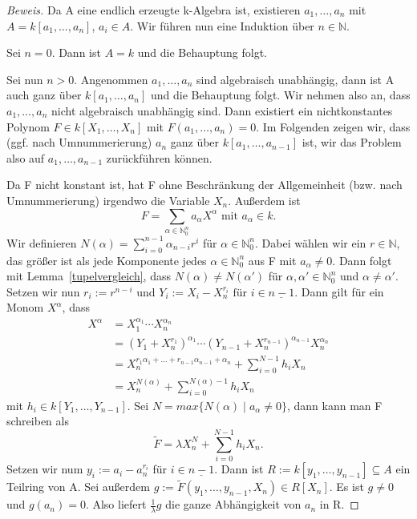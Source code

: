 \documentclass{article}
\begin{document}
	\begin{proof}[Beweis]
	Da A eine endlich erzeugte k-Algebra ist, existieren \(a_1,\ldots,a_n\) mit
	\(A = k[a_1,\ldots,a_n]\), \(a_i \in A\). Wir führen nun eine Induktion
	über \(n \in \mathbb{N}\).

	Sei \(n=0\). Dann ist \(A=k\) und die Behauptung folgt.

	Sei nun \(n > 0\). Angenommen \(a_1,\ldots,a_n\) sind algebraisch unabhängig,
	dann ist A auch ganz über \(k[a_1,\ldots,a_n]\) und die Behauptung folgt.
	Wir nehmen also an, dass \(a_1,\ldots,a_n\) nicht algebraisch unabhängig sind.
	Dann existiert ein nichtkonstantes Polynom \(F \in  k[X_1,\ldots,X_n]\)	mit
	\(F(a_1,\ldots,a_n) = 0\).
	Im Folgenden zeigen wir, dass (ggf. nach Umnummerierung) \(a_n\) ganz über
	\(k[a_1,\ldots,a_{n-1}]\) ist, wir das Problem also auf \(a_1,\ldots,a_{n-1}\)
	zurückführen können.

	Da F nicht konstant ist, hat F ohne Beschränkung der Allgemeinheit (bzw.
	nach Umnummerierung) irgendwo die Variable \(X_n\). Außerdem ist
	\begin{displaymath} F = \sum_{\alpha \in \mathbb{N}^n_0} a_{\alpha}X^{\alpha}
	\text{ mit } a_{\alpha}\in k.\end{displaymath}
	Wir definieren \(N(\alpha) = \sum^{n-1}_{i=0} \alpha_{n-i}r^i\) für
	\(\alpha \in \mathbb{N}^n_0\). Dabei wählen wir ein \(r \in \mathbb{N}\),
	das größer ist als jede Komponente jedes \(\alpha \in \mathbb{N}^n_0\) aus F
	mit \(a_{\alpha} \neq 0\). Dann folgt mit Lemma~\ref{tupelvergleich}, dass
	\(N(\alpha) \neq N(\alpha')\) für \(\alpha, \alpha' \in \mathbb{N}^n_0\) und
	\(\alpha \neq \alpha'\). Setzen wir nun
	\( r_i := r^{n-i} \text{ und } Y_i := X_i - X_n^{r_i}
	\text{ für } i \in \underline{n-1}\). Dann gilt für ein Monom \(X^{\alpha}\),
	dass \begin{align*}
	X^{\alpha} &= X_1^{\alpha_1}\cdots X_{n}^{\alpha_n} \\
	&= (Y_1 + X_n^{r_1})^{\alpha_1} \cdots (Y_{n-1} + X_n^{r_{n-1}})^{\alpha_{n-1}}X_n^{\alpha_n} \\
	&= X_n^{r_1\alpha_1 + \ldots + r_{n-1}\alpha_{n-1} + \alpha_n} + \sum_{i=0}^{N-1} h_iX_n \\
	&= X_n^{N(\alpha)} + \sum_{i=0}^{N(\alpha)-1} h_iX_n
	\end{align*}
	mit \(h_i \in k[Y_1, \ldots, Y_{n-1}]\). Sei \(N = max\{N(\alpha)\;|\;a_{\alpha}
	\neq 0\}\), dann kann man F schreiben als
	\begin{displaymath} \tilde{F} = \lambda X_n^N + \sum_{i=0}^{N-1} h_iX_n.
	\end{displaymath}
	Setzen wir num \(y_i := a_i - a_n^{r_i}\) für \(i \in \underline{n-1}\).
	Dann ist \(R := k[y_1,\ldots,y_{n-1}] \subseteq A\) ein Teilring von A.
	Sei außerdem \(g := \tilde{F}(y_1,\ldots,y_{n-1},X_n) \in R[X_n]\).
	Es ist \(g \neq 0\) und \(g(a_n) = 0\). Also liefert \(\frac{1}{\lambda}g\)
	die ganze Abhängigkeit von \(a_n\) in R.


\end{proof}
\end{document}
